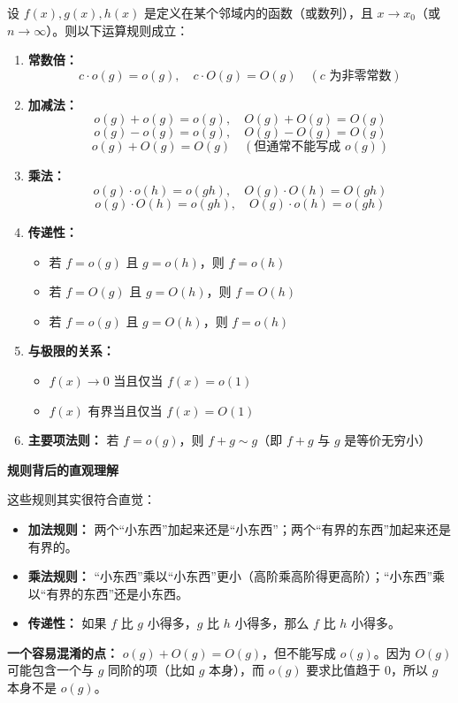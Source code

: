 \documentclass[fontset=fandol]{ctexart}
\newenvironment{custom}[1]{\par\noindent\textbf{#1}\quad}{\par\vspace{0.8em}}
\begin{document}
\begin{theorem}[小 \(o\) 与大 \(O\) 的运算性质]
设 \(f(x), g(x), h(x)\) 是定义在某个邻域内的函数（或数列），且 \(x \to x_0\)（或 \(n \to \infty\)）。则以下运算规则成立：

\begin{enumerate}
\item \textbf{常数倍：}
   \[
   c \cdot o(g) = o(g),\quad c \cdot O(g) = O(g) \quad (c \text{ 为非零常数})
   \]

\item \textbf{加减法：}
   \[
   o(g) + o(g) = o(g),\quad O(g) + O(g) = O(g)
   \]
   \[
   o(g) - o(g) = o(g),\quad O(g) - O(g) = O(g)
   \]
   \[
   o(g) + O(g) = O(g) \quad (\text{但通常不能写成 } o(g))
   \]

\item \textbf{乘法：}
   \[
   o(g) \cdot o(h) = o(gh),\quad O(g) \cdot O(h) = O(gh)
   \]
   \[
   o(g) \cdot O(h) = o(gh),\quad O(g) \cdot o(h) = o(gh)
   \]

\item \textbf{传递性：}
   \begin{itemize}
   \item 若 \(f = o(g)\) 且 \(g = o(h)\)，则 \(f = o(h)\)
   \item 若 \(f = O(g)\) 且 \(g = O(h)\)，则 \(f = O(h)\)
   \item 若 \(f = o(g)\) 且 \(g = O(h)\)，则 \(f = o(h)\)
   \end{itemize}

\item \textbf{与极限的关系：}
   \begin{itemize}
   \item \(f(x) \to 0\) 当且仅当 \(f(x) = o(1)\)
   \item \(f(x)\) 有界当且仅当 \(f(x) = O(1)\)
   \end{itemize}

\item \textbf{主要项法则：} 若 \(f = o(g)\)，则 \(f + g \sim g\)（即 \(f+g\) 与 \(g\) 是等价无穷小）
\end{enumerate}
\end{theorem}

\begin{custom}{规则背后的直观理解}

这些规则其实很符合直觉：

\begin{itemize}
\item \textbf{加法规则：} 两个“小东西”加起来还是“小东西”；两个“有界的东西”加起来还是有界的。
\item \textbf{乘法规则：} “小东西”乘以“小东西”更小（高阶乘高阶得更高阶）；“小东西”乘以“有界的东西”还是小东西。
\item \textbf{传递性：} 如果 \(f\) 比 \(g\) 小得多，\(g\) 比 \(h\) 小得多，那么 \(f\) 比 \(h\) 小得多。
\end{itemize}

\textbf{一个容易混淆的点：} \(o(g) + O(g) = O(g)\)，但不能写成 \(o(g)\)。因为 \(O(g)\) 可能包含一个与 \(g\) 同阶的项（比如 \(g\) 本身），而 \(o(g)\) 要求比值趋于 0，所以 \(g\) 本身不是 \(o(g)\)。
\end{custom}
\end{document}
